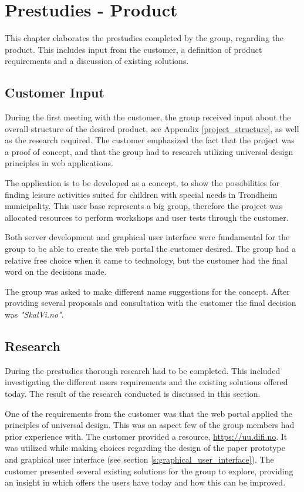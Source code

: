 
\chapter{Prestudies - Product}
This chapter elaborates the prestudies completed by the group, regarding the product. This includes input from the customer, a definition of product requirements and a discussion of existing solutions. 

\section{Customer Input}
\label{Customer input}
During the first meeting with the customer, the group received input about the overall structure of the desired product, see Appendix \ref{project_structure}, as well as the research required. The customer emphasized the fact that the project was a proof of concept, and that the group had to research utilizing universal design principles in web applications.

The application is to be developed as a concept, to show the possibilities for finding leisure activities suited for children with special needs in Trondheim municipality. This user base represents a big group, therefore the project was allocated resources to perform workshops and user tests through the customer.

Both server development and graphical user interface were fundamental for the group to be able to create the web portal the customer desired. The group had a relative free choice when it came to technology, but the customer had the final word on the decisions made.

The group was asked to make different name suggestions for the concept. After providing several proposals and consultation with the customer the final decision was \textit{"SkalVi.no"}.

\section{Research}
During the prestudies thorough research had to be completed. This included investigating the different users requirements and the existing solutions offered today. The result of the research conducted is discussed in this section.

One of the requirements from the customer was that the web portal applied the principles of universal design. This was an aspect few of the group members had prior experience with. The customer provided a resource, \url{https://uu.difi.no}. It was utilized while making choices regarding the design of the paper prototype and graphical user interface (see section \ref{s:graphical_user_interface}). The customer presented several existing solutions for the group to explore, providing an insight in which offers the users have today and how this can be improved. 


